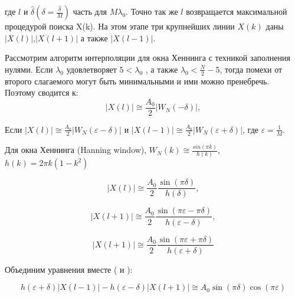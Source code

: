 где $l$ и $\hat{\delta}
\left( {\delta= \frac{\hat{\delta}}{M}}\right) $
часть для $M\lambda_0$. Точно так же $l$ возвращается максимальной процедурой поиска X(k). На этом этапе три крупнейших линии $X(k)$ даны $\left| {X(l)} \right|$,$\left| {X(l+1)} \right|$ а также $\left|{X(l-1)}\right|$.

Рассмотрим алгоритм интерполяции для окна Хеннинга с техникой заполнения нулями.
Если $\lambda_0$ удовлетворяет $5<\lambda_0$ , а также $\lambda_0 < \frac{N}{2}-5$, тогда помехи от второго слагаемого могут быть минимальными и ими можно пренебречь. Поэтому  сводится к:
\begin{equation}
	\label{eq:equation25}
	\left| {X(l)} \right| \cong \frac{A_0}{2}\left| {W_N(-\delta)} \right|,
\end{equation}

Если $\left| {X(l)} \right| \cong \frac{A_0}{2}\left| {W_N(\varepsilon -\delta)} \right|$ и $\left| {X(l-1)} \right| \cong \frac{A_0}{2} \left| {W_N(\varepsilon +\delta)} \right|$, где $\varepsilon=\frac{1}{M}$. 

Для окна Хеннинга (Hanning window), $W_N (k) \cong \frac{sin(\pi k)}{h(k)}$,
$h(k) = 2 \pi k (1-k^2)$ \cite{xie1996nonlinear}

\begin{equation}
	\label{eq:equation26}
	\left| {X(l)} \right| \cong \frac{A_0}{2} \frac{\sin{(\pi \delta)} }{h(\delta)} ,
\end{equation}

\begin{equation}
	\label{eq:equation27}
	\left| {X(l+1)} \right| \cong \frac{A_0}{2} \frac{\sin{(\pi \varepsilon - \pi \delta)} }{h(\varepsilon - \delta)} ,
\end{equation}

\begin{equation}
	\label{eq:equation28}
	\left| {X(l+1)} \right| \cong \frac{A_0}{2} \frac{\sin{(\pi \varepsilon + \pi \delta)} }{h(\varepsilon + \delta)}
\end{equation}

Объединим уравнения вместе ( и ):

\begin{equation}
	\label{eq:equation29}
	h(\varepsilon+\delta)\left|{X(l-1)} \right| - h(\varepsilon-\delta) \left|{X(l+1)} \right| \cong A_0 \sin{(\pi \delta)} \cos{(\pi \varepsilon)}
\end{equation}

